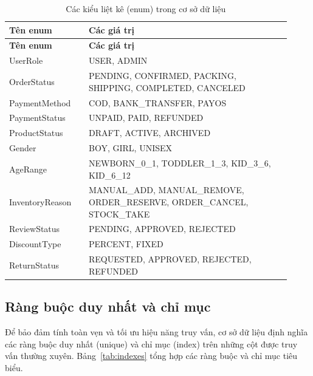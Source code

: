\begin{longtable}{|>{\raggedright\arraybackslash}p{0.26\linewidth}|>{\raggedright\arraybackslash}p{0.66\linewidth}|}
\caption{Các kiểu liệt kê (enum) trong cơ sở dữ liệu}\label{tab:enums}\\
\hline
\rowcolor{gray!12}\textbf{Tên enum} & \textbf{Các giá trị} \\ \hline
\endfirsthead
\hline
\rowcolor{gray!12}\textbf{Tên enum} & \textbf{Các giá trị} \\ \hline
\endhead
UserRole & USER, ADMIN \\ \hline
OrderStatus & PENDING, CONFIRMED, PACKING, SHIPPING, COMPLETED, CANCELED \\ \hline
PaymentMethod & COD, BANK\_TRANSFER, PAYOS \\ \hline
PaymentStatus & UNPAID, PAID, REFUNDED \\ \hline
ProductStatus & DRAFT, ACTIVE, ARCHIVED \\ \hline
Gender & BOY, GIRL, UNISEX \\ \hline
AgeRange & NEWBORN\_0\_1, TODDLER\_1\_3, KID\_3\_6, KID\_6\_12 \\ \hline
InventoryReason & MANUAL\_ADD, MANUAL\_REMOVE, ORDER\_RESERVE, ORDER\_CANCEL, STOCK\_TAKE \\ \hline
ReviewStatus & PENDING, APPROVED, REJECTED \\ \hline
DiscountType & PERCENT, FIXED \\ \hline
ReturnStatus & REQUESTED, APPROVED, REJECTED, REFUNDED \\ \hline
\end{longtable}

\subsection{Ràng buộc duy nhất và chỉ mục}

Để bảo đảm tính toàn vẹn và tối ưu hiệu năng truy vấn, cơ sở dữ liệu định nghĩa các ràng buộc
duy nhất (unique) và chỉ mục (index) trên những cột được truy vấn thường xuyên. Bảng~\ref{tab:indexes}
tổng hợp các ràng buộc và chỉ mục tiêu biểu.

